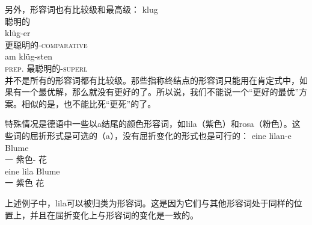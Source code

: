 另外，形容词也有比较级和最高级：
\eal
\ex 
\gll klug\\
	聪明的\\
\ex 
\gll klüg-er\\
	 更聪明的-\textsc{comparative}\\
\ex 
\gll am klüg-sten\\
     \textsc{prep}.  最聪明的-\textsc{superl}\\
\zl
并不是所有的形容词都有比较级。那些指称终结点的形容词只能用在肯定式中，如果有一个最优解，那么就没有更好的了。所以说，我们不能说一个“更好的最优”方案。相似的是，也不能比死“更死”的了。

特殊情况是德语中一些以a结尾的颜色形容词，如lila（紫色）和rosa（粉色）。这些词的屈折形式是可选的（a），没有屈折变化的形式也是可行的：
\eal
\ex 
\gll eine lilan-e Blume\\
	 一 紫色-\fem{} 花\\
\ex 
\gll eine lila Blume\\
	 一 紫色 花\\
\zl

\noindent
上述例子中，lila可以被归类为形容词。这是因为它们与其他形容词处于同样的位置上，并且在屈折变化上与形容词的变化是一致的。

